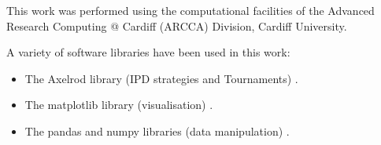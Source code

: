 \documentclass[10pt,letterpaper]{article}
\begin{document}
This work was performed using the computational facilities of the Advanced
Research Computing @ Cardiff (ARCCA) Division, Cardiff University.

A variety of software libraries have been used in this work:

\begin{itemize}
    \item The Axelrod library (IPD strategies and Tournaments)
        \cite{axelrodproject}.
    \item The matplotlib library (visualisation) \cite{hunter2007matplotlib}.
    \item The pandas and numpy libraries (data manipulation)
        \cite{mckinney2010data, walt2011numpy}.
\end{itemize}

\nolinenumbers
\end{document}
